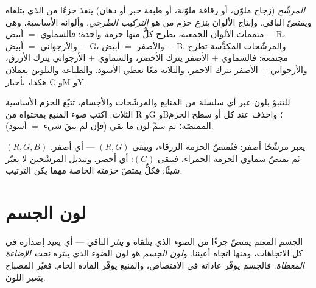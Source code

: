 \begin{definition}\label{def:g11:color-light-sources:subtractive}
\emph{المرشّح} (زجاج ملوّن، أو رقاقة ملوّنة، أو طبقة حبر أو
دهان) ينفذ جزءًا من  الذي يتلقاه ويمتصّ الباقي.
وإنتاج الألوان \emph{بنزع} حزم من  هو
\emph{التركيب الطرحي}. وألوانه
الأساسية، وهي متممات الألوان الجمعية، يطرح كلٌّ منها حزمة واحدة:
فالسماوي $=$ أبيض $-$ R، والأرجواني $=$ أبيض $-$ G، والأصفر $=$ أبيض $-$ B.
والمرشّحات المكدَّسة تطرح مجتمعة: فالسماوي $+$ الأصفر يترك الأخضر، والسماوي
$+$ الأرجواني يترك الأزرق، والأرجواني $+$ الأصفر يترك الأحمر، والثلاثة معًا تعطي الأسود. والطباعة
والتلوين يعملان هكذا، بأحبار C وM وY.
\end{definition}

\begin{method}\label{met:g11:color-light-sources:bookkeeping}
للتنبؤ بلون عبر أي سلسلة من المنابع والمرشّحات والأجسام،
تتبّع الحزم الأساسية الثلاث: اكتب ضوء المنبع بمحتواه
من R وG وB؛ واحذف عند كل  أو سطح الحزمَ الممتصّة؛
ثم سمِّ لون ما بقي (فإن لم يبقَ شيء $=$ أسود).
\end{method}

\begin{example}\label{ex:g11:color-light-sources:chain}
 $(R, G, B)$ يعبر مرشّحًا أصفر: فتُمتصّ الحزمة الزرقاء،
ويبقى $(R, G)$ --- أي أصفر. ثم يمتصّ  سماوي
الحزمة الحمراء، فيبقى $(G)$: أي أخضر. وتبديل المرشّحين لا يغيّر شيئًا:
فكلٌّ يمتصّ حزمته الخاصة مهما يكن الترتيب.
\end{example}

\section{لون الجسم}

\begin{definition}\label{def:g11:color-light-sources:objectcolor}
الجسم المعتم يمتصّ جزءًا من الضوء الذي يتلقاه و
\emph{ينثر} الباقي --- أي يعيد إصداره في كل
الاتجاهات، ومنها اتجاه أعيننا. و\emph{لون
الجسم} هو لون الضوء الذي ينثره
\emph{تحت الإضاءة المعطاة}: فالجسم يوفّر عاداته في الامتصاص،
والمنبع يوفّر المادة الخام. فغيّر المصباح يتغير اللون.
\end{definition}

